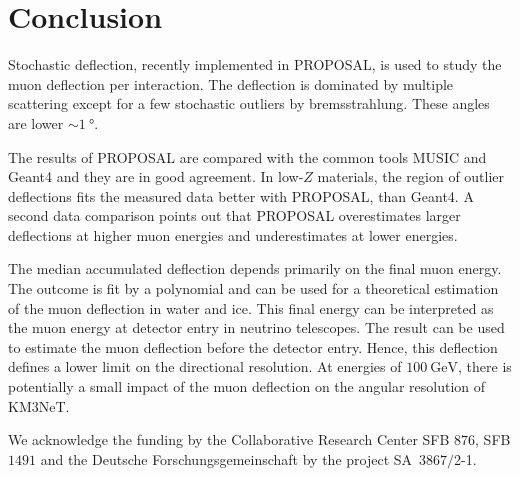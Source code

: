 \documentclass[pdflatex, sn-mathphys]{sn-jnl}%
\theoremstyle{thmstyleone}%
\theoremstyle{thmstyletwo}%
\theoremstyle{thmstylethree}%
\begin{document}
\section{Conclusion}\label{sec:conclusion}

Stochastic deflection, recently implemented in PROPOSAL, is 
used to study the muon deflection per interaction. The deflection 
is dominated by multiple scattering except for a few stochastic 
outliers by bremsstrahlung. These angles are lower 
$\sim\SI{1}{\degree}$. 

The results of PROPOSAL are compared with the common tools MUSIC and 
Geant4 and they are in good agreement. In low-$Z$ materials, the region of outlier 
deflections fits the measured data better with PROPOSAL, than Geant4. 
A second data comparison points out that PROPOSAL overestimates 
larger deflections at higher muon energies and underestimates at lower 
energies.

The median accumulated deflection depends primarily on the final muon energy. 
The outcome is fit by a polynomial and can be used for 
a theoretical estimation of the muon deflection in water and ice.
This final energy can be interpreted as the muon energy at detector entry 
in neutrino telescopes. 
The result can 
be used to estimate the muon deflection before the detector entry.
Hence, this deflection defines a lower limit on the directional resolution.
At energies of $\SI{100}{\giga\electronvolt}$, there is potentially a small impact of the muon deflection on the angular 
resolution of KM3NeT.


\backmatter


We acknowledge the funding by the Collaborative Research Center SFB $876$, SFB $1491$ 
and the Deutsche Forschungsgemeinschaft by the project SA~$3867/$2-1.



\end{document}
